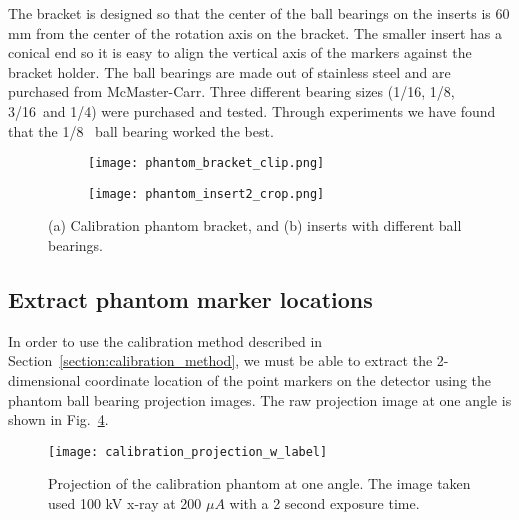 The bracket is designed so that the center of the ball bearings on the inserts is 60 mm from the center of the rotation axis on the bracket.  The smaller insert has a conical end so it is easy to align the vertical axis of the markers against the bracket holder.  The ball bearings are made out of stainless steel and are purchased from McMaster-Carr.  Three different bearing sizes (1/16\inches, 1/8\inches,~ 3/16\inches ~and 1/4\inches) were purchased and tested.  Through experiments we have found that the 1/8\inches~ ball bearing worked the best.
%
\begin{figure}[ht]
	\begin{subfigure}[b]{0.3\linewidth}
	\texttt{[image: phantom\_bracket\_clip.png]}
	\label{fig:calibration_phantom_bracket}
	\caption{}
	\end{subfigure}
\hspace{0.2cm}
	\begin{subfigure}[b]{0.3\linewidth}
	\texttt{[image: phantom\_insert2\_crop.png]}
	\label{fig:calibration_phantom_insert}
	\caption{}
	\end{subfigure}
\caption{(a) Calibration phantom bracket, and (b) inserts with different ball bearings.}
\label{fig:calibration_phantom}
\end{figure}

\subsection{Extract phantom marker locations}
In order to use the calibration method described in Section~\ref{section:calibration_method}, we must be able to extract the 2-dimensional coordinate location of the point markers on the detector using the phantom ball bearing projection images.  The raw projection image at one angle is shown in Fig.~\ref{fig:calibration_projection}.
%
\begin{figure}[ht]
\centering
\texttt{[image: calibration\_projection\_w\_label]}
\caption{Projection of the calibration phantom at one angle.  The image taken used 100 kV x-ray at 200 $\mu A$ with a 2 second exposure time.}
\label{fig:calibration_projection}
\end{figure}

